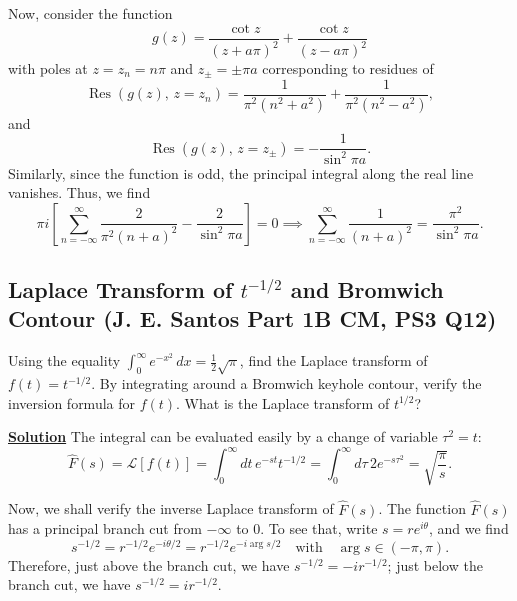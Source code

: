 Now, consider the function
\begin{equation}
    g(z) = \frac{\cot z}{(z+a\pi)^2} + \frac{\cot z}{(z-a\pi)^2}
\end{equation}
with poles at $z= z_n = n\pi$ and $z_\pm  = \pm \pi a$ corresponding to residues of
\begin{equation}
    \operatorname{Res}(g(z), \, z=z_n) = \frac{1}{\pi^2(n^2+a^2)}+\frac{1}{\pi^2(n^2-a^2)},
\end{equation}
and
\begin{equation}
    \operatorname{Res}(g(z), \, z=z_\pm) = -\frac{1}{\sin^2 \pi a}.
\end{equation}
Similarly, since the function is odd, the principal integral along the real line vanishes. Thus, we find
\begin{equation}
    \pi i \left[\sum_{n=-\infty}^\infty\frac{2}{\pi^2(n+a)^2} - \frac{2}{\sin^2 \pi a}\right] =0 \implies \sum_{n=-\infty}^\infty\frac{1}{(n+a)^2} =\frac{\pi^2}{\sin^2 \pi a}.
\end{equation}

\subsection{Laplace Transform of $t^{-1/2}$ and Bromwich Contour (J. E. Santos Part 1B CM, PS3 Q12)}
\label{sec:laplace-bromwich}

Using the equality $\int_0^\infty e^{-x^2}\,d x
= \frac{1}{2}\sqrt{\pi}$, find the Laplace transform of $f(t) = t^{-1/2}$.
By integrating around a Bromwich keyhole contour, verify the inversion formula
for $f(t)$. What is the Laplace transform of $t^{1/2}$?

\noindent \underline{\textbf{Solution}} The integral can be evaluated easily by a change of variable $\tau^2 = t$:
\begin{equation}
    \hat{F}(s) = \mathcal{L}[f(t)] = \int^\infty _ 0 dt \,e^{-st}t^{-1/2} = \int^\infty_0 d\tau \, 2e^{-s\tau^2} = \sqrt{\frac{\pi}{s}}.
\end{equation}

Now, we shall verify the inverse Laplace transform of $\hat{F}(s)$. The function $\hat{F}(s)$ has a principal branch cut from $-\infty$ to $0$. To see that, write $s=re^{i\theta}$, and we find
\begin{equation}
    s^{-1/2} = r^{-1/2}e^{-i\theta/2}  = r^{-1/2}e^{-i\arg s/2} \quad \text{with} \quad    \arg s\in (-\pi, \pi).
\end{equation}
Therefore, just above the branch cut, we have $s^{-1/2} = -ir^{-1/2}$; just below the branch cut, we have $s^{-1/2} = ir^{-1/2}$.


